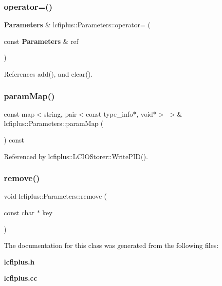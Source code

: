 \mbox{\label{classlcfiplus_1_1Parameters_ab1ff29728d805f7dac49233261fe10d1}} 
\subsubsection{operator=()}
{\footnotesize\ttfamily \textbf{ Parameters} \& lcfiplus\+::\+Parameters\+::operator= (\begin{DoxyParamCaption}\item[{const \textbf{ Parameters} \&}]{ref }\end{DoxyParamCaption})}



References add(), and clear().

\mbox{\label{classlcfiplus_1_1Parameters_a9da54d56ac681813f61e38c40c00bdb1}} 
\subsubsection{param\+Map()}
{\footnotesize\ttfamily const map$<$string, pair$<$const type\+\_\+info$\ast$, void$\ast$$>$ $>$\& lcfiplus\+::\+Parameters\+::param\+Map (\begin{DoxyParamCaption}{ }\end{DoxyParamCaption}) const\hspace{0.3cm}{\ttfamily [inline]}}



Referenced by lcfiplus\+::\+L\+C\+I\+O\+Storer\+::\+Write\+P\+I\+D().

\mbox{\label{classlcfiplus_1_1Parameters_a87390bb27075c4c6e382044dcb9cc510}} 
\subsubsection{remove()}
{\footnotesize\ttfamily void lcfiplus\+::\+Parameters\+::remove (\begin{DoxyParamCaption}\item[{const char $\ast$}]{key }\end{DoxyParamCaption})\hspace{0.3cm}{\ttfamily [inline]}}



The documentation for this class was generated from the following files\+:\begin{DoxyCompactItemize}
\item 
\textbf{ lcfiplus.\+h}\item 
\textbf{ lcfiplus.\+cc}\end{DoxyCompactItemize}
